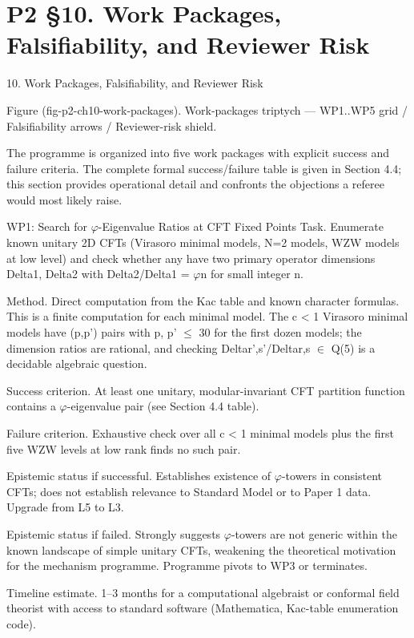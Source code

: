 
\section{P2 §10. Work Packages, Falsifiability, and Reviewer Risk}

10. Work Packages, Falsifiability, and Reviewer Risk

      Figure (fig-p2-ch10-work-packages). Work-packages triptych --- WP1..WP5 grid / Falsifiability
                                    arrows / Reviewer-risk shield.

  The programme is organized into five work packages with explicit success and failure
  criteria. The complete formal success/failure table is given in Section 4.4; this section
  provides operational detail and confronts the objections a referee would most likely
  raise.

  WP1: Search for $\varphi$-Eigenvalue Ratios at CFT Fixed Points
  Task. Enumerate known unitary 2D CFTs (Virasoro minimal models, N=2 models, WZW
  models at low level) and check whether any have two primary operator dimensions
  Delta1, Delta2 with Delta2/Delta1 = $\varphi$n for small integer n.

  Method. Direct computation from the Kac table and known character formulas. This is a
  finite computation for each minimal model. The c < 1 Virasoro minimal models have
  (p,p') pairs with p, p' $\leq$ 30 for the first dozen models; the dimension ratios are rational,
  and checking Deltar',s'/Deltar,s $\in$ Q(5) is a decidable algebraic question.

  Success criterion. At least one unitary, modular-invariant CFT partition function
  contains a $\varphi$-eigenvalue pair (see Section 4.4 table).

  Failure criterion. Exhaustive check over all c < 1 minimal models plus the first five
  WZW levels at low rank finds no such pair.

  Epistemic status if successful. Establishes existence of $\varphi$-towers in consistent CFTs;
  does not establish relevance to Standard Model or to Paper 1 data. Upgrade from L5 to
  L3.

  Epistemic status if failed. Strongly suggests $\varphi$-towers are not generic within the known
  landscape of simple unitary CFTs, weakening the theoretical motivation for the
  mechanism programme. Programme pivots to WP3 or terminates.

  Timeline estimate. 1--3 months for a computational algebraist or conformal field theorist
  with access to standard software (Mathematica, Kac-table enumeration code).


